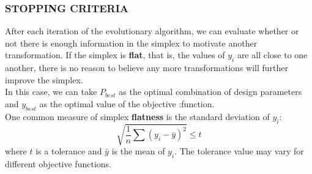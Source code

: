 \documentclass[aspectratio=169]{beamer}
\begin{document}
	\begin{frame}
		\frametitle{STOPPING CRITERIA}
		After each iteration of the evolutionary algorithm, we can evaluate whether or not there is enough information in the simplex to motivate another transformation. If the simplex is \textbf{flat}, that is, the values of $y_i$ are all close to one another, there is no reason to believe any more transformations will further improve the simplex.
		\\[\baselineskip]
		In this case, we can take $P_{best}$ as the optimal combination of design parameters and $y_{best}$ as the optimal value of the objective :function.
		\\[\baselineskip]
		One common measure of simplex \textbf{flatness} is the standard deviation of $y_i$:
		$$ \sqrt{\frac{1}{n}\sum{(y_i-\bar{y})^2}}\le t$$
		where $t$ is a tolerance and $\bar{y}$ is the mean of $y_i$. The tolerance value may vary for different objective functions.
	\end{frame}
\end{document}
